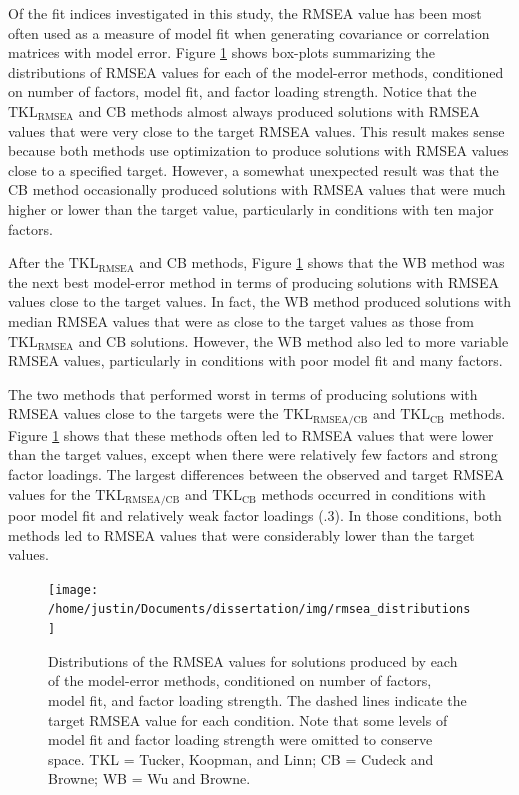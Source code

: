 \documentclass[11pt]{umnthesis}
\begin{document}
Of the fit indices investigated in this study, the RMSEA value has been most often used as a measure of model fit when generating covariance or correlation matrices with model error. Figure \ref{fig:rmsea-distributions} shows box-plots summarizing the distributions of RMSEA values for each of the model-error methods, conditioned on number of factors, model fit, and factor loading strength. Notice that the \(\textrm{TKL}_{\textrm{RMSEA}}\) and CB methods almost always produced solutions with RMSEA values that were very close to the target RMSEA values. This result makes sense because both methods use optimization to produce solutions with RMSEA values close to a specified target. However, a somewhat unexpected result was that the CB method occasionally produced solutions with RMSEA values that were much higher or lower than the target value, particularly in conditions with ten major factors.

After the \(\textrm{TKL}_{\textrm{RMSEA}}\) and CB methods, Figure \ref{fig:rmsea-distributions} shows that the WB method was the next best model-error method in terms of producing solutions with RMSEA values close to the target values. In fact, the WB method produced solutions with median RMSEA values that were as close to the target values as those from \(\textrm{TKL}_{\textrm{RMSEA}}\) and CB solutions. However, the WB method also led to more variable RMSEA values, particularly in conditions with poor model fit and many factors.

The two methods that performed worst in terms of producing solutions with RMSEA values close to the targets were the \(\textrm{TKL}_{\textrm{RMSEA/CB}}\) and \(\textrm{TKL}_{\textrm{CB}}\) methods. Figure \ref{fig:rmsea-distributions} shows that these methods often led to RMSEA values that were lower than the target values, except when there were relatively few factors and strong factor loadings. The largest differences between the observed and target RMSEA values for the \(\textrm{TKL}_{\textrm{RMSEA/CB}}\) and \(\textrm{TKL}_{\textrm{CB}}\) methods occurred in conditions with poor model fit and relatively weak factor loadings (.3). In those conditions, both methods led to RMSEA values that were considerably lower than the target values.

\begin{figure}

\texttt{[image: /home/justin/Documents/dissertation/img/rmsea\_distributions]} \hfill{}

\caption[Distributions of the RMSEA values for solutions produced by each of the model-error methods, conditioned on number of factors, model fit, and factor loading strength]{Distributions of the RMSEA values for solutions produced by each of the model-error methods, conditioned on number of factors, model fit, and factor loading strength. The dashed lines indicate the target RMSEA value for each condition. Note that some levels of model fit and factor loading strength were omitted to conserve space. TKL = Tucker, Koopman, and Linn; CB = Cudeck and Browne; WB = Wu and Browne.}\label{fig:rmsea-distributions}
\end{figure}
\end{document}
